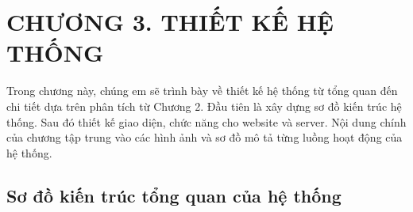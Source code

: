
\section*{CHƯƠNG 3. THIẾT KẾ HỆ THỐNG}
\setcounter{section}{3}
\setcounter{subsection}{0} %
\setcounter{table}{0} %
\setcounter{figure}{0} %

Trong chương này, chúng em sẽ trình bày về thiết kế hệ thống từ tổng quan đến chi tiết dựa trên phân tích từ Chương 2.
Đầu tiên là xây dựng sơ đồ kiến trúc hệ thống.
Sau đó thiết kế giao diện, chức năng cho website và server.
Nội dung chính của chương tập trung vào các hình ảnh và sơ đồ mô tả từng luồng hoạt động của hệ thống.
\subsection{Sơ đồ kiến trúc tổng quan của hệ thống}

